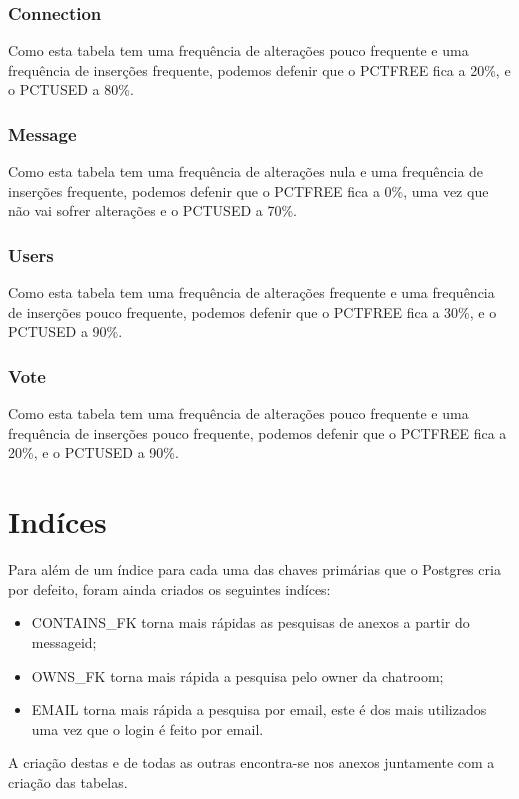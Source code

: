 \documentclass[a4paper, 12pt]{article}
\begin{document}
\subsubsection{Connection}
\indent \indent Como esta tabela tem uma frequência de alterações pouco frequente e uma frequência de inserções frequente, podemos defenir que o PCTFREE fica a 20\%, e o PCTUSED a 80\%. 

\subsubsection{Message}
\indent \indent Como esta tabela tem uma frequência de alterações nula e uma frequência de inserções frequente, podemos defenir que o PCTFREE fica a 0\%, uma vez que não vai sofrer alterações e o PCTUSED a 70\%. 

\subsubsection{Users}
\indent \indent Como esta tabela tem uma frequência de alterações frequente e uma frequência de inserções pouco frequente, podemos defenir que o PCTFREE fica a 30\%, e o PCTUSED a 90\%.

\subsubsection{Vote}
\indent \indent Como esta tabela tem uma frequência de alterações pouco frequente e uma frequência de inserções pouco frequente, podemos defenir que o PCTFREE fica a 20\%, e o PCTUSED a 90\%.
\cleardoublepage


\section{Indíces}
\indent \indent Para além de um índice para cada uma das chaves primárias que o Postgres cria por defeito, foram ainda criados os seguintes indíces:
\begin{itemize}
    \item CONTAINS\_FK torna mais rápidas as pesquisas de anexos a partir do messageid;
    \item OWNS\_FK torna mais rápida a pesquisa pelo owner da chatroom;
    \item EMAIL torna mais rápida a pesquisa por email, este é dos mais utilizados uma vez que o login é feito por email.
\end{itemize}

A criação destas e de todas as outras encontra-se nos anexos juntamente com a criação das tabelas.
\cleardoublepage
\end{document}
